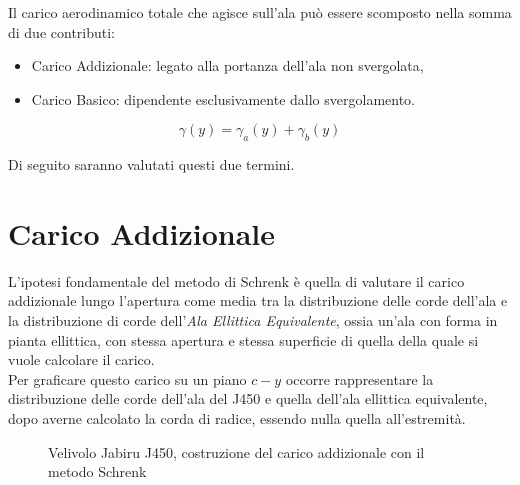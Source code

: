 Il carico aerodinamico totale che agisce sull’ala può essere scomposto nella somma di due contributi:

\begin {itemize}
\item Carico Addizionale: legato alla portanza dell’ala non svergolata,
\item Carico Basico: dipendente esclusivamente dallo svergolamento.
\end{itemize}

\begin{equation}
\label{eqn:carico}
{\gamma}(y)={\gamma}_a(y)+ {\gamma}_b(y)
\end{equation}

Di seguito saranno valutati questi due termini.


\section{Carico Addizionale}

L'ipotesi fondamentale del metodo di Schrenk è quella di valutare il carico addizionale lungo l’apertura come media tra la distribuzione delle corde dell’ala e la distribuzione di corde dell’{\itshape Ala Ellittica Equivalente}, ossia un’ala con forma in pianta ellittica, con stessa apertura e stessa superficie di quella della quale si vuole calcolare il carico.\\
Per graficare questo carico su un piano $c-y$ occorre rappresentare la distribuzione delle corde dell'ala del J450 e quella dell'ala ellittica equivalente, dopo averne calcolato la corda di radice, essendo nulla quella all'estremità. 

\begin{figure} [h]
\centering
{}
\caption{\footnotesize Velivolo Jabiru J450, costruzione del carico addizionale con il metodo Schrenk}
\end{figure}

\noindent \\

